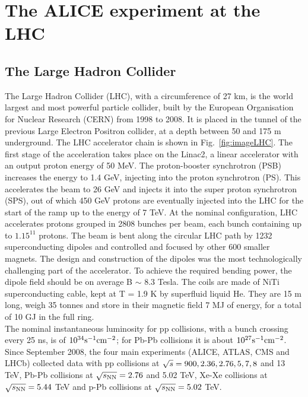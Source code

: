 \chapter{The ALICE experiment at the LHC}

\section{The Large Hadron Collider}
The Large Hadron Collider (LHC), with a circumference of 27 km, 
is the world largest and most powerful particle collider, built by the 
European Organisation for Nuclear Research (CERN) from 1998 to 2008. 
It is placed in the tunnel of the previous Large Electron Positron collider, at a depth between 50 and 175 m underground.
The LHC accelerator chain is shown in Fig.~\ref{fig:imageLHC}. The first stage 
of the acceleration takes place on the Linac2, a linear accelerator with an 
output proton energy of 50 MeV. The proton-booster synchrotron (PSB) increases 
the energy to 1.4 GeV, injecting into the proton synchrotron (PS). This accelerates the
 beam to 26 GeV and injects it into the super proton synchrotron (SPS), out of which 
 450 GeV protons are eventually injected into the LHC for the start of the ramp up to 
 the energy of 7 TeV. At the nominal configuration, LHC accelerates protons grouped in 2808 bunches per beam, each bunch 
 containing up to $1.15^{11}$ protons. The beam is bent along the circular LHC 
 path by 1232 superconducting dipoles and controlled and focused by other 
 600 smaller magnets. The design and construction of the dipoles was the most 
 technologically challenging part of the accelerator. To achieve the required bending power, 
 the dipole field should be on average B $\sim$ 8.3 Tesla. The coils are made of 
 NiTi superconducting cable, kept at T = 1.9 K by superfluid liquid He. They are 
 15 m long, weigh 35 tonnes and store in their magnetic field 7 MJ of energy, for a total of 10 GJ in the full ring.\\
The nominal instantaneous luminosity for pp collisions, with a bunch crossing every 25 ns, is of $10^{34} {\rm s}^{-1} {\rm cm}^{-2}$; for 
Pb-Pb collisions it is about $10^{27} {\rm s}^{-1} {\rm cm}^{-2}$. Since September 2008, 
the four main experiments (ALICE, ATLAS, CMS and LHCb) collected data with pp
 collisions at $\sqrt{s}=900, 2.36, 2.76, 5, 7, 8$ and 13 TeV, 
 Pb-Pb collisions at $\sqrt{s_{\rm NN}}=2.76$ and 5.02 TeV, Xe-Xe collisions at $\sqrt{s_{\rm NN}}=5.44$ TeV and p-Pb collisions at $\sqrt{s_{\rm NN}}=5.02$ TeV.

